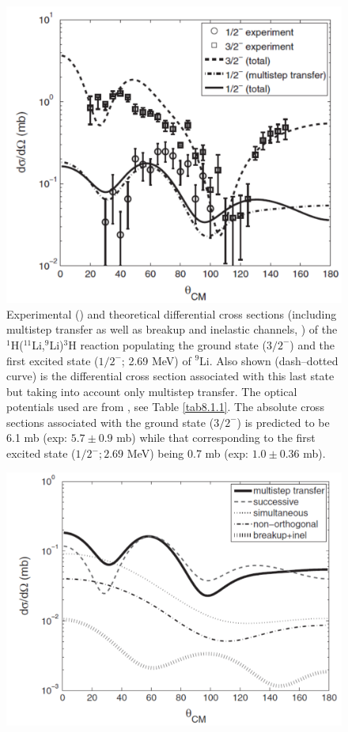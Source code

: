 \begin{subappendices}
    \begin{figure}
    \centerline{\includegraphics*[width=12cm,angle=0]{C8/figsC8/fig8_B_2}}
    	\caption{Experimental (\cite{Tanihata:08}) and theoretical differential cross sections (including multistep transfer as well as breakup and inelastic channels, \cite{Potel:10})  of the
    	$^1$H($^{11}$Li,$^9$Li)$^3$H  reaction populating the ground state ($3/2^-$) and the first excited state ($1/2^-$; 2.69 MeV) of $^{9}$Li. Also shown (dash--dotted curve) is the differential cross section associated with this last state but taking into account only multistep transfer. The optical potentials used are from \citep{Tanihata:08,An:06}, see Table \ref{tab8.1.1}. The absolute cross sections associated with the ground state ($3/2^-$) is predicted to be 6.1 mb (exp: $5.7\pm 0.9$ mb) while that corresponding to the first excited state ($1/2^-; 2.69$ MeV) being 0.7 mb (exp: $1.0\pm 0.36$ mb). }\label{fig8_B_2}
    \end{figure}
        \begin{figure}
        \centerline{\includegraphics*[width=12cm,angle=0]{C8/figsC8/fig8_B_3}}

\end{figure}
\end{subappendices}
